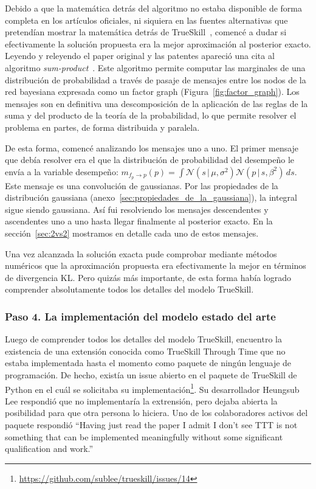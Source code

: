 \documentclass[a4paper,11pt]{book}
\newcommand{\N}{\mathcal{N}}
\theoremstyle{definition}
\begin{document}
Debido a que la matemática detrás del algoritmo no estaba disponible de forma completa en los artículos oficiales, ni siquiera en las fuentes alternativas que pretendían mostrar la matemática detrás de TrueSkill~\cite{Mosser2011}, comencé a dudar si efectivamente la solución propuesta era la mejor aproximación al posterior exacto.
%
Leyendo y releyendo el paper original y las patentes apareció una cita al algoritmo \emph{sum-product}~\cite{Kschischang2001}.
%
Este algoritmo permite computar las marginales de una distribución de probabilidad a través de pasaje de mensajes entre los nodos de la red bayesiana expresada como un factor graph (Figura~\ref{fig:factor_graph}).
%
Los mensajes son en definitiva una descomposición de la aplicación de las reglas de la suma y del producto de la teoría de la probabilidad, lo que permite resolver el problema en partes, de forma distribuida y paralela.


De esta forma, comencé analizando los mensajes uno a uno.
%
El primer mensaje que debía resolver era el que la distribución de probabilidad del desempeño le envía a la variable desempeño:
$m_{f_p\rightarrow p}(p) = \int \N(s\,|\,\mu, \sigma^2) \N(p\,|\,s,\beta^2) \, ds$.
%
Este mensaje es una convolución de gaussianas.
%
Por las propiedades de la distribución gaussiana (anexo~\ref{sec:propiedades_de_la_gaussiana}), la integral sigue siendo gaussiana.
%
Así fui resolviendo los mensajes descendentes y ascendentes uno a uno hasta llegar finalmente al posterior exacto.
%
En la sección~\ref{sec:2vs2} mostramos en detalle cada uno de estos mensajes.


Una vez alcanzada la solución exacta pude comprobar mediante métodos numéricos que la aproximación propuesta era efectivamente la mejor en términos de divergencia KL.
%
Pero quizás más importante, de esta forma había logrado comprender absolutamente todos los detalles del modelo TrueSkill.

\subsubsection{Paso 4. La implementación del modelo estado del arte}

Luego de comprender todos los detalles del modelo TrueSkill, encuentro la existencia de una extensión conocida como TrueSkill Through Time que no estaba implementada hasta el momento como paquete de ningún lenguaje de programación.
%
De hecho, existía un issue abierto en el paquete de TrueSkill de Python en el cuál se solicitaba su implementación\footnote{\url{https://github.com/sublee/trueskill/issues/14}}.
%
Su desarrollador Heungsub Lee respondió que no implementaría la extrensión, pero dejaba abierta la posibilidad para que otra persona lo hiciera.
%
Uno de los colaboradores activos del paquete respondió ``Having just read the paper I admit I don't see TTT is not something that can be implemented meaningfully without some significant qualification and work.''
\end{document}
